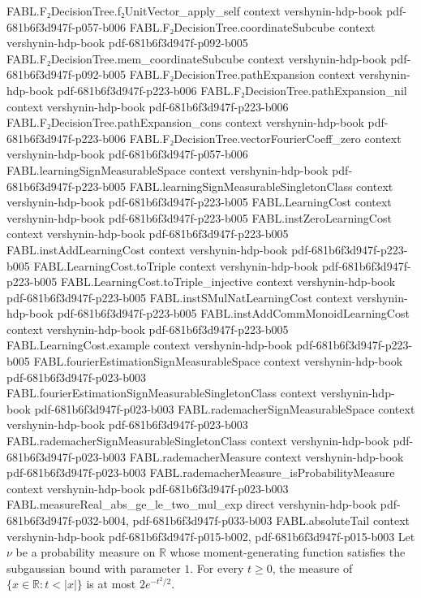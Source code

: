 \begin{theorem}
\proofstep
  {FABL.F₂DecisionTree.f₂UnitVector_apply_self}
  {context}
  {vershynin-hdp-book}
  {pdf-681b6f3d947f-p057-b006}
\proofstep
  {FABL.F₂DecisionTree.coordinateSubcube}
  {context}
  {vershynin-hdp-book}
  {pdf-681b6f3d947f-p092-b005}
\proofstep
  {FABL.F₂DecisionTree.mem_coordinateSubcube}
  {context}
  {vershynin-hdp-book}
  {pdf-681b6f3d947f-p092-b005}
\proofstep
  {FABL.F₂DecisionTree.pathExpansion}
  {context}
  {vershynin-hdp-book}
  {pdf-681b6f3d947f-p223-b006}
\proofstep
  {FABL.F₂DecisionTree.pathExpansion_nil}
  {context}
  {vershynin-hdp-book}
  {pdf-681b6f3d947f-p223-b006}
\proofstep
  {FABL.F₂DecisionTree.pathExpansion_cons}
  {context}
  {vershynin-hdp-book}
  {pdf-681b6f3d947f-p223-b006}
\proofstep
  {FABL.F₂DecisionTree.vectorFourierCoeff_zero}
  {context}
  {vershynin-hdp-book}
  {pdf-681b6f3d947f-p057-b006}
\proofstep
  {FABL.learningSignMeasurableSpace}
  {context}
  {vershynin-hdp-book}
  {pdf-681b6f3d947f-p223-b005}
\proofstep
  {FABL.learningSignMeasurableSingletonClass}
  {context}
  {vershynin-hdp-book}
  {pdf-681b6f3d947f-p223-b005}
\proofstep
  {FABL.LearningCost}
  {context}
  {vershynin-hdp-book}
  {pdf-681b6f3d947f-p223-b005}
\proofstep
  {FABL.instZeroLearningCost}
  {context}
  {vershynin-hdp-book}
  {pdf-681b6f3d947f-p223-b005}
\proofstep
  {FABL.instAddLearningCost}
  {context}
  {vershynin-hdp-book}
  {pdf-681b6f3d947f-p223-b005}
\proofstep
  {FABL.LearningCost.toTriple}
  {context}
  {vershynin-hdp-book}
  {pdf-681b6f3d947f-p223-b005}
\proofstep
  {FABL.LearningCost.toTriple_injective}
  {context}
  {vershynin-hdp-book}
  {pdf-681b6f3d947f-p223-b005}
\proofstep
  {FABL.instSMulNatLearningCost}
  {context}
  {vershynin-hdp-book}
  {pdf-681b6f3d947f-p223-b005}
\proofstep
  {FABL.instAddCommMonoidLearningCost}
  {context}
  {vershynin-hdp-book}
  {pdf-681b6f3d947f-p223-b005}
\proofstep
  {FABL.LearningCost.example}
  {context}
  {vershynin-hdp-book}
  {pdf-681b6f3d947f-p223-b005}
\proofstep
  {FABL.fourierEstimationSignMeasurableSpace}
  {context}
  {vershynin-hdp-book}
  {pdf-681b6f3d947f-p023-b003}
\proofstep
  {FABL.fourierEstimationSignMeasurableSingletonClass}
  {context}
  {vershynin-hdp-book}
  {pdf-681b6f3d947f-p023-b003}
\proofstep
  {FABL.rademacherSignMeasurableSpace}
  {context}
  {vershynin-hdp-book}
  {pdf-681b6f3d947f-p023-b003}
\proofstep
  {FABL.rademacherSignMeasurableSingletonClass}
  {context}
  {vershynin-hdp-book}
  {pdf-681b6f3d947f-p023-b003}
\proofstep
  {FABL.rademacherMeasure}
  {context}
  {vershynin-hdp-book}
  {pdf-681b6f3d947f-p023-b003}
\proofstep
  {FABL.rademacherMeasure_isProbabilityMeasure}
  {context}
  {vershynin-hdp-book}
  {pdf-681b6f3d947f-p023-b003}
\proofstep
  {FABL.measureReal_abs_ge_le_two_mul_exp}
  {direct}
  {vershynin-hdp-book}
  {pdf-681b6f3d947f-p032-b004,
    pdf-681b6f3d947f-p033-b003}
\proofstep
  {FABL.absoluteTail}
  {context}
  {vershynin-hdp-book}
  {pdf-681b6f3d947f-p015-b002,
    pdf-681b6f3d947f-p015-b003}
Let $\nu$ be a probability measure on $\mathbb{R}$ whose moment-generating function
satisfies the subgaussian bound with parameter $1$. For every $t\ge 0$, the measure of
$\{x\in\mathbb{R}:t<|x|\}$ is at most $2e^{-t^2/2}$.
\end{theorem}

